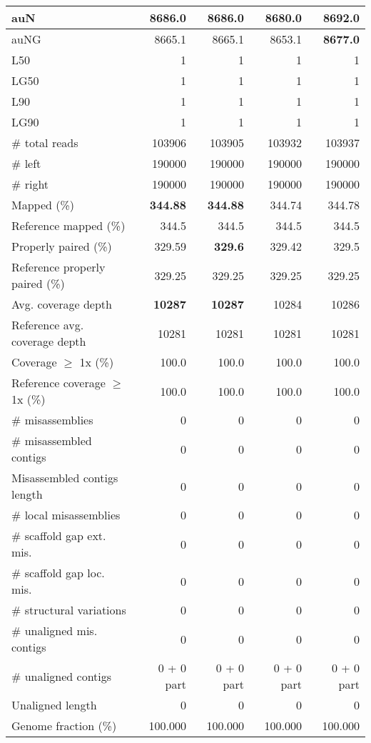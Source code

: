 \documentclass[12pt,a4paper]{article}
\begin{document}
\begin{table}[ht]
\begin{center}
\begin{tabular}{|l*{4}{|r}|}
auN & 8686.0 & 8686.0 & 8680.0 & {\bf 8692.0} \\ \hline
auNG & 8665.1 & 8665.1 & 8653.1 & {\bf 8677.0} \\ \hline
L50 & 1 & 1 & 1 & 1 \\ \hline
LG50 & 1 & 1 & 1 & 1 \\ \hline
L90 & 1 & 1 & 1 & 1 \\ \hline
LG90 & 1 & 1 & 1 & 1 \\ \hline
\# total reads & 103906 & 103905 & 103932 & 103937 \\ \hline
\# left & 190000 & 190000 & 190000 & 190000 \\ \hline
\# right & 190000 & 190000 & 190000 & 190000 \\ \hline
Mapped (\%) & {\bf 344.88} & {\bf 344.88} & 344.74 & 344.78 \\ \hline
Reference mapped (\%) & 344.5 & 344.5 & 344.5 & 344.5 \\ \hline
Properly paired (\%) & 329.59 & {\bf 329.6} & 329.42 & 329.5 \\ \hline
Reference properly paired (\%) & 329.25 & 329.25 & 329.25 & 329.25 \\ \hline
Avg. coverage depth & {\bf 10287} & {\bf 10287} & 10284 & 10286 \\ \hline
Reference avg. coverage depth & 10281 & 10281 & 10281 & 10281 \\ \hline
Coverage $\geq$ 1x (\%) & 100.0 & 100.0 & 100.0 & 100.0 \\ \hline
Reference coverage $\geq$ 1x (\%) & 100.0 & 100.0 & 100.0 & 100.0 \\ \hline
\# misassemblies & 0 & 0 & 0 & 0 \\ \hline
\# misassembled contigs & 0 & 0 & 0 & 0 \\ \hline
Misassembled contigs length & 0 & 0 & 0 & 0 \\ \hline
\# local misassemblies & 0 & 0 & 0 & 0 \\ \hline
\# scaffold gap ext. mis. & 0 & 0 & 0 & 0 \\ \hline
\# scaffold gap loc. mis. & 0 & 0 & 0 & 0 \\ \hline
\# structural variations & 0 & 0 & 0 & 0 \\ \hline
\# unaligned mis. contigs & 0 & 0 & 0 & 0 \\ \hline
\# unaligned contigs & 0 + 0 part & 0 + 0 part & 0 + 0 part & 0 + 0 part \\ \hline
Unaligned length & 0 & 0 & 0 & 0 \\ \hline
Genome fraction (\%) & 100.000 & 100.000 & 100.000 & 100.000 \\ \hline

\end{tabular}
\end{center}
\end{table}
\end{document}
